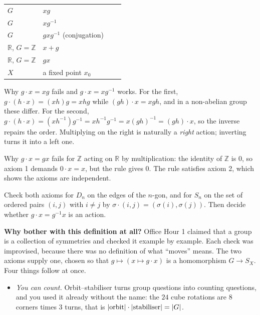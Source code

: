 \documentclass[10pt]{article}
\newcommand{\cmark}{\textcolor{why}{\ding{51}}}
\newcommand{\xmark}{\textcolor{pit}{\ding{55}}}
\newcommand{\Z}{\mathbb{Z}}
\newcommand{\R}{\mathbb{R}}
\newcommand{\inv}{^{-1}}
\begin{document}
{\begin{minipage}[t]{744pt}
\begin{minipage}[t]{298pt}
\begin{tabular}{@{}llcc@{}}
$G$ & $xg$ & \cmark & \xmark\\
$G$ & $xg\inv$ & \cmark & \cmark\\
$G$ & $gxg\inv$ (conjugation) & \cmark & \cmark\\
$\R$, $G=\Z$ & $x+g$ & \cmark & \cmark\\
$\R$, $G=\Z$ & $gx$ & \xmark & \cmark\\
$X$ & a fixed point $x_0$ & \xmark & \cmark\\
\bottomrule
\end{tabular}\par\vspace{3pt}
\raggedright
\begin{why}
Why $g\cdot x=xg$ fails and $g\cdot x=xg\inv$ works. For the first, $g\cdot(h\cdot x)=(xh)g=xhg$ while $(gh)\cdot x=xgh$, and in a non-abelian group these differ. For the second, $g\cdot(h\cdot x)=(xh\inv)g\inv=xh\inv g\inv=x(gh)\inv=(gh)\cdot x$, so the inverse repairs the order. Multiplying on the right is naturally a \emph{right} action; inverting turns it into a left one.
\end{why}
\begin{why}
Why $g\cdot x=gx$ fails for $\Z$ acting on $\R$ by multiplication: the identity of $\Z$ is $0$, so axiom 1 demands $0\cdot x=x$, but the rule gives $0$. The rule satisfies axiom 2, which shows the axioms are independent.
\end{why}
\begin{tryit}
Check both axioms for $D_n$ on the edges of the $n$-gon, and for $S_n$ on the set of ordered pairs $(i,j)$ with $i\neq j$ by $\sigma\cdot(i,j)=(\sigma(i),\sigma(j))$. Then decide whether $g\cdot x=g\inv x$ is an action.
\end{tryit}
\end{minipage}
\par\vspace{4pt}
\begin{bigpic}
\begin{minipage}[t]{352pt}\vspace{0pt}
\textbf{Why bother with this definition at all?} Office Hour 1 claimed that a group is a collection of symmetries and checked it example by example. Each check was improvised, because there was no definition of what ``moves'' means. The two axioms supply one, chosen so that $g\mapsto(x\mapsto g\cdot x)$ is a homomorphism $G\to S_X$. Four things follow at once.
\begin{itemize}[nosep,leftmargin=1.2em,topsep=2pt]
\item \emph{You can count.} Orbit--stabiliser turns group questions into counting questions, and you used it already without the name: the $24$ cube rotations are $8$ corners times $3$ turns, that is $|{\rm orbit}|\cdot|{\rm stabiliser}|=|G|$.

\end{itemize}
\end{minipage}
\end{bigpic}
\end{minipage}}
\end{document}
